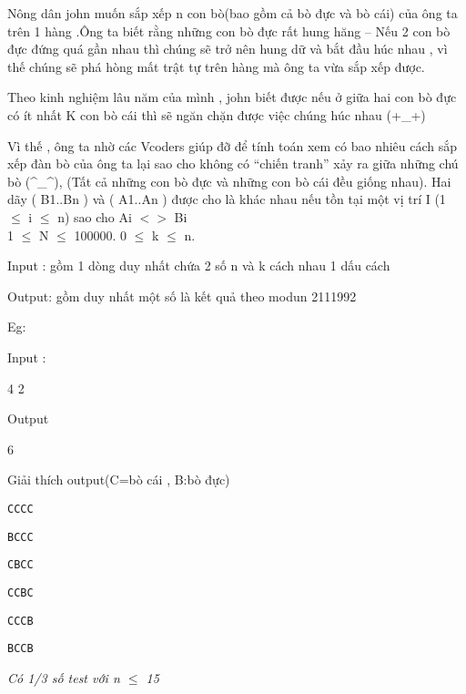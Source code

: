 



   Nông dân john muốn sắp xếp n con bò(bao gồm cả bò đực và bò cái) của ông ta trên 1 hàng .Ông ta biết rằng những con bò đực rất hung hăng – Nếu 2 con bò đực đứng quá gần nhau thì chúng sẽ trở nên hung dữ và bắt đầu húc nhau , vì thế chúng sẽ phá hòng mất trật tự trên hàng mà ông ta vừa sắp xếp được.  

   Theo kinh nghiệm lâu năm của mình , john biết được nếu ở giữa hai con bò đực có ít nhất K con bò cái thì sẽ ngăn chặn được việc chúng húc nhau (+\_+)  

   Vì thế , ông ta nhờ các Vcoders giúp đỡ để tính toán xem có bao nhiêu cách sắp xếp đàn bò của ông ta lại sao cho không có “chiến tranh” xảy ra giữa những chú bò (^\_^), (Tất cả những con bò đực và những con bò cái đều giống nhau). Hai dãy (       B1..Bn       ) và (       A1..An       ) được cho là khác nhau nếu tồn tại một vị trí I (1 $\le$ i $\le$ n) sao cho       Ai $<$$>$ Bi    
\\

   1 $\le$ N $\le$ 100000. 0 $\le$ k $\le$ n.  

   Input : gồm 1 dòng duy nhất chứa 2 số n và k cách nhau 1 dấu cách  

   Output: gồm duy nhất một số là kết quả theo modun 2111992  



   Eg:  

   Input :  



   4 2  



   Output  



   6  



   Giải thích output(C=bò cái , B:bò đực)  
\begin{verbatim}
CCCC\end{verbatim}
\begin{verbatim}
BCCC\end{verbatim}
\begin{verbatim}
CBCC\end{verbatim}
\begin{verbatim}
CCBC\end{verbatim}
\begin{verbatim}
CCCB\end{verbatim}
\begin{verbatim}
BCCB\end{verbatim}

\emph{    Có 1/3 số test với n $\le$ 15   }
